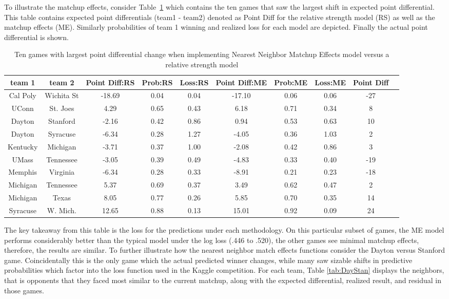To illustrate the matchup effects, consider Table~\ref{tab:change} which contains the ten games that saw the largest shift in expected point differential. This table contains expected point differentials (team1 - team2) denoted as Point Diff for the relative strength model (RS) as well as the matchup effects (ME).  Similarly probabilities of team 1 winning and realized loss for each model are depicted.  Finally the actual point differential is shown.
\begin{table}[h!]
\caption{ Ten games with largest point differential change when implementing Nearest Neighbor Matchup Effects model versus a relative strength model}
\scriptsize
\centering
\begin{tabular}{|cc | ccc | ccc | c|c|}
  \hline
  \hline
 team 1 & team 2 & Point Diff:RS & Prob:RS & Loss:RS & Point Diff:ME & Prob:ME & Loss:ME & Point Diff\\ 
  \hline
 Cal Poly & Wichita St & -18.69 & 0.04 & 0.04 & -17.10 & 0.06 & 0.06 &  -27\\ 
 UConn & St. Joes &4.29 & 0.65 & 0.43 & 6.18 & 0.71 & 0.34 & 8\\ 
 Dayton & Stanford & -2.16 & 0.42 & 0.86 & 0.94 & 0.53 & 0.63 & 10 \\ 
 Dayton & Syracuse & -6.34 & 0.28 & 1.27 & -4.05 & 0.36 & 1.03 & 2\\ 
 Kentucky & Michigan & -3.71 & 0.37 & 1.00 & -2.08 & 0.42 & 0.86 &  3\\ 
 UMass & Tennessee &-3.05 & 0.39 & 0.49 & -4.83 & 0.33 & 0.40 & -19\\ 
 Memphis & Virginia & -6.34 & 0.28 & 0.33 & -8.91 & 0.21 & 0.23 & -18\\ 
 Michigan & Tennessee & 5.37 & 0.69 & 0.37 & 3.49 & 0.62 & 0.47 & 2\\ 
 Michigan & Texas & 8.05 & 0.77 & 0.26 & 5.85 & 0.70 & 0.35 & 14\\ 
 Syracuse & W. Mich. & 12.65 & 0.88 & 0.13 & 15.01 & 0.92 & 0.09 & 24\\ 
   \hline
   \hline
\end{tabular}
\label{tab:change}
\end{table}
The key takeaway from this table is the loss for the predictions under each methodology. On this particular subset of games, the ME model performs considerably better than the typical model under the log loss (.446 to .520), the other games see minimal matchup effects, therefore, the results are similar.  To further illustrate how the nearest neighbor match effects functions consider the Dayton versus Stanford game.  Coincidentally this is the only game which the actual predicted winner changes, while many saw sizable shifts in predictive probabilities which factor into the loss function used in the Kaggle competition.  For each team, Table \ref{tab:DayStan} displays the neighbors, that is opponents that they faced most similar to the current matchup, along with the expected differential, realized result, and residual in those games. 
